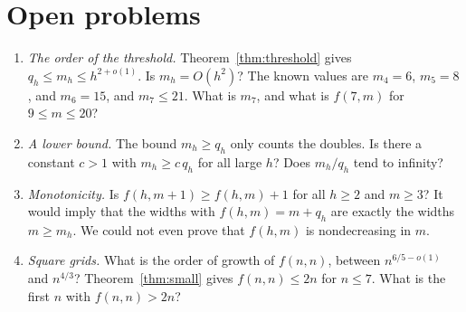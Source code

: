 \section{Open problems}\label{sec:open}

\begin{enumerate}[(1),leftmargin=*]
\item \emph{The order of the threshold.} Theorem~\ref{thm:threshold} gives
$q_h\le m_h\le h^{2+o(1)}$. Is $m_h=O(h^2)$? The known values are $m_4=6$, $m_5=8$, and
$m_6=15$, and $m_7\le21$. What is $m_7$, and what is $f(7,m)$ for
$9\le m\le20$?
\item \emph{A lower bound.} The bound $m_h\ge q_h$ only counts the doubles. Is there a
constant $c>1$ with $m_h\ge c\,q_h$ for all large $h$? Does $m_h/q_h$ tend to infinity?
\item \emph{Monotonicity.} Is $f(h,m+1)\ge f(h,m)+1$ for all $h\ge2$ and $m\ge3$? It would
imply that the widths with $f(h,m)=m+q_h$ are exactly the widths $m\ge m_h$. We could not even prove that $f(h,m)$ is
nondecreasing in $m$.
\item \emph{Square grids.} What is the order of growth of $f(n,n)$, between $n^{6/5-o(1)}$
and $n^{4/3}$? Theorem~\ref{thm:small} gives $f(n,n)\le2n$ for $n\le7$. What is the first
$n$ with $f(n,n)>2n$?
\end{enumerate}
